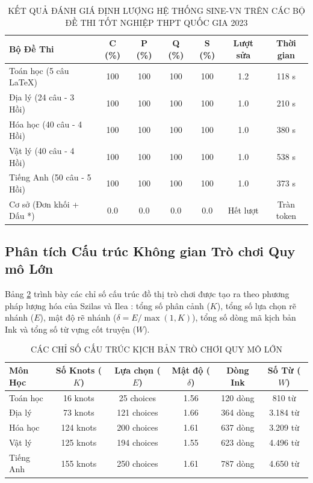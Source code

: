 \documentclass[conference]{IEEEtran}
\begin{document}
\begin{table}[htbp]
\caption{KẾT QUẢ ĐÁNH GIÁ ĐỊNH LƯỢNG HỆ THỐNG SINE-VN TRÊN CÁC BỘ ĐỀ THI TỐT NGHIỆP THPT QUỐC GIA 2023}
\label{tab:results}
\begin{center}
\begin{tabular}{lcccccc}
\toprule
\textbf{Bộ Đề Thi} & \textbf{C (\%)} & \textbf{P (\%)} & \textbf{Q (\%)} & \textbf{S (\%)} & \textbf{Lượt sửa} & \textbf{Thời gian} \\
\midrule
Toán học (5 câu LaTeX) & 100 & 100 & 100 & 100 & 1.2 & 118 s \\
Địa lý (24 câu - 3 Hồi) & 100 & 100 & 100 & 100 & 1.0 & 210 s \\
Hóa học (40 câu - 4 Hồi) & 100 & 100 & 100 & 100 & 1.0 & 380 s \\
Vật lý (40 câu - 4 Hồi) & 100 & 100 & 100 & 100 & 1.0 & 538 s \\
Tiếng Anh (50 câu - 5 Hồi) & 100 & 100 & 100 & 100 & 1.0 & 373 s \\
\midrule
Cơ sở (Đơn khối + Dấu *) & 0.0 & 0.0 & 0.0 & 0.0 & Hết lượt & Tràn token \\
\bottomrule
\end{tabular}
\end{center}
\end{table}

\subsection{Phân tích Cấu trúc Không gian Trò chơi Quy mô Lớn}
Bảng \ref{tab:structural} trình bày các chỉ số cấu trúc đồ thị trò chơi được tạo ra theo phương pháp lượng hóa của Szilas và Ilea \cite{szilas2014}: tổng số phân cảnh ($K$), tổng số lựa chọn rẽ nhánh ($E$), mật độ rẽ nhánh ($\delta = E / \max(1, K)$), tổng số dòng mã kịch bản Ink và tổng số từ vựng cốt truyện ($W$).

\begin{table}[htbp]
\caption{CÁC CHỈ SỐ CẤU TRÚC KỊCH BẢN TRÒ CHƠI QUY MÔ LỚN}
\label{tab:structural}
\begin{center}
\begin{tabular}{lccccc}
\toprule
\textbf{Môn Học} & \textbf{Số Knots ($K$)} & \textbf{Lựa chọn ($E$)} & \textbf{Mật độ ($\delta$)} & \textbf{Dòng Ink} & \textbf{Số Từ ($W$)} \\
\midrule
Toán học & 16 knots & 25 choices & 1.56 & 120 dòng & 810 từ \\
Địa lý & 73 knots & 121 choices & 1.66 & 364 dòng & 3.184 từ \\
Hóa học & 124 knots & 200 choices & 1.61 & 637 dòng & 3.209 từ \\
Vật lý & 125 knots & 194 choices & 1.55 & 623 dòng & 4.496 từ \\
Tiếng Anh & 155 knots & 250 choices & 1.61 & 787 dòng & 4.650 từ \\
\bottomrule
\end{tabular}
\end{center}
\end{table}
\end{document}
